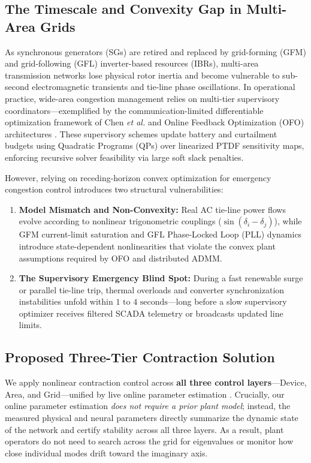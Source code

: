 \documentclass[journal]{IEEEtran}
\begin{document}
\subsection{The Timescale and Convexity Gap in Multi-Area Grids}
As synchronous generators (SGs) are retired and replaced by grid-forming (GFM) and grid-following (GFL) inverter-based resources (IBRs), multi-area transmission networks lose physical rotor inertia and become vulnerable to sub-second electromagnetic transients and tie-line phase oscillations. In operational practice, wide-area congestion management relies on multi-tier supervisory coordinators—exemplified by the communication-limited differentiable optimization framework of Chen \textit{et al.} \cite{chen26} and Online Feedback Optimization (OFO) architectures \cite{dallanese26}. These supervisory schemes update battery and curtailment budgets using Quadratic Programs (QPs) over linearized PTDF sensitivity maps, enforcing recursive solver feasibility via large soft slack penalties.

However, relying on receding-horizon convex optimization for emergency congestion control introduces two structural vulnerabilities:
\begin{enumerate}
    \item \textbf{Model Mismatch and Non-Convexity:} Real AC tie-line power flows evolve according to nonlinear trigonometric couplings ($\sin(\delta_i - \delta_j)$), while GFM current-limit saturation and GFL Phase-Locked Loop (PLL) dynamics introduce state-dependent nonlinearities that violate the convex plant assumptions required by OFO and distributed ADMM.
    \item \textbf{The Supervisory Emergency Blind Spot:} During a fast renewable surge or parallel tie-line trip, thermal overloads and converter synchronization instabilities unfold within $1\text{ to }4\text{ seconds}$—long before a slow supervisory optimizer receives filtered SCADA telemetry or broadcasts updated line limits.
\end{enumerate}

\subsection{Proposed Three-Tier Contraction Solution}
We apply nonlinear contraction control across \textbf{all three control layers}—Device, Area, and Grid—unified by live online parameter estimation \cite{zhou24, kohler26}. Crucially, our online parameter estimation \emph{does not require a prior plant model}; instead, the measured physical and neural parameters directly summarize the dynamic state of the network and certify stability across all three layers. As a result, plant operators do not need to search across the grid for eigenvalues or monitor how close individual modes drift toward the imaginary axis.
\end{document}
